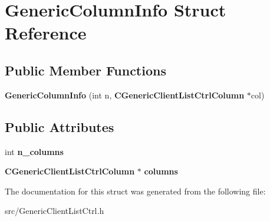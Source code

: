 \section{GenericColumnInfo Struct Reference}
\label{structGenericColumnInfo}
\subsection*{Public Member Functions}
\begin{DoxyCompactItemize}
\item 
{\bfseries GenericColumnInfo} (int n, {\bf CGenericClientListCtrlColumn} $\ast$col)\label{structGenericColumnInfo_adc4246ab59229f734996cdef021c883d}

\end{DoxyCompactItemize}
\subsection*{Public Attributes}
\begin{DoxyCompactItemize}
\item 
int {\bfseries n\_\-columns}\label{structGenericColumnInfo_ac15e7eff8efda931e6e8b553b0d83f95}

\item 
{\bf CGenericClientListCtrlColumn} $\ast$ {\bfseries columns}\label{structGenericColumnInfo_afef7bf17300e0c766bcf5dbfb4da73ff}

\end{DoxyCompactItemize}


The documentation for this struct was generated from the following file:\begin{DoxyCompactItemize}
\item 
src/GenericClientListCtrl.h\end{DoxyCompactItemize}
